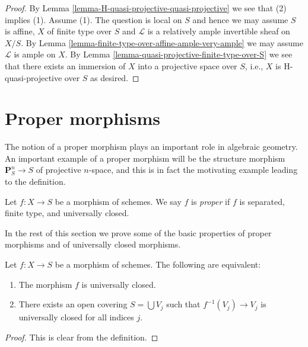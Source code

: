 \begin{proof}
By Lemma \ref{lemma-H-quasi-projective-quasi-projective}
we see that (2) implies (1). Assume (1).
The question is local on $S$ and hence we may assume $S$ is affine,
$X$ of finite type over $S$ and
$\mathcal{L}$ is a relatively ample invertible sheaf on $X/S$.
By Lemma \ref{lemma-finite-type-over-affine-ample-very-ample}
we may assume $\mathcal{L}$ is ample on $X$.
By Lemma \ref{lemma-quasi-projective-finite-type-over-S} we see that there
exists an immersion of $X$ into
a projective space over $S$, i.e., $X$ is H-quasi-projective over $S$
as desired.
\end{proof}





\section{Proper morphisms}
\label{section-proper}

\noindent
The notion of a proper morphism plays an important role in algebraic
geometry. An important example of a proper morphism will be the
structure morphism $\mathbf{P}^n_S \to S$ of projective $n$-space,
and this is in fact the motivating example leading to the definition.

\begin{definition}
\label{definition-proper}
Let $f : X \to S$ be a morphism of schemes.
We say $f$ is {\it proper} if $f$ is separated, finite type, and
universally closed.
\end{definition}

\noindent
In the rest of this section we prove some of the basic properties
of proper morphisms and of universally closed morphisms.

\begin{lemma}
\label{lemma-universally-closed-local-on-the-base}
Let $f : X \to S$ be a morphism of schemes.
The following are equivalent:
\begin{enumerate}
\item The morphism $f$ is universally closed.
\item There exists an open covering $S = \bigcup V_j$ such
that $f^{-1}(V_j) \to V_j$ is universally closed for all indices $j$.
\end{enumerate}
\end{lemma}

\begin{proof}
This is clear from the definition.
\end{proof}

